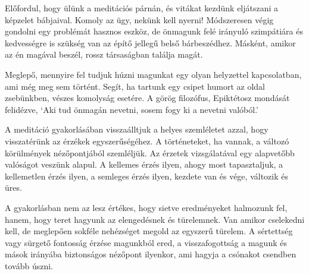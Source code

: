 Előfordul, hogy ülünk a meditációs párnán, és vitákat kezdünk eljátszani
a képzelet bábjaival. Komoly az ügy, nekünk kell nyerni! Módszeresen
végig gondolni egy problémát hasznos eszköz, de önmagunk felé irányuló
szimpátiára és kedvességre is szükség van az építő jellegű belső
bárbeszédhez. Másként, amikor az én magával beszél, rossz társaságban
találja magát.

Meglepő, mennyire fel tudjuk húzni magunkat egy olyan helyzettel
kapcsolatban, ami még meg sem történt. Segít, ha tartunk egy csipet
humort az oldal zsebünkben, vészes komolyság esetére. A görög filozófus,
Epiktétosz mondását felidézve, `Aki tud önmagán nevetni, sosem fogy ki a
nevetni valóból.'

A meditáció gyakorlásában visszaálltjuk a helyes szemléletet azzal, hogy
visszatérünk az érzékek egyszerűségéhez. A történeteket, ha vannak, a
változó körülmények nézőpontjából szemléljük. Az érzetek vizsgálatával
egy alapvetőbb valóságot veszünk alapul. A kellemes érzés ilyen, ahogy
most tapasztaljuk, a kellemetlen érzés ilyen, a semleges érzés ilyen,
kezdete van és vége, változik és üres.

A gyakorlásban nem az lesz értékes, hogy sietve eredményeket halmozunk
fel, hanem, hogy teret hagyunk az elengedésnek és türelemnek. Van amikor
cselekedni kell, de meglepően sokféle nehézséget megold az egyszerű
türelem. A sértettség vagy sürgető fontosság érzése magunkból ered, a
visszafogottság a magunk és mások irányába biztonságos nézőpont
ilyenkor, ami hagyja a csónakot csendben tovább úszni.
